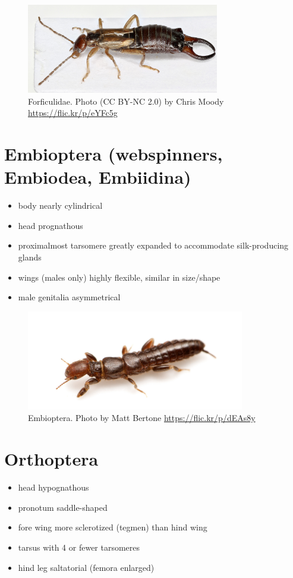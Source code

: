 \documentclass[letterpaper, 11pt]{article}
\begin{document}
\begin{figure}[ht!]
  \centering
    \includegraphics[width=0.75\textwidth]{forfic1}
  \caption{Forficulidae. Photo (CC BY-NC 2.0) by Chris Moody \url{https://flic.kr/p/eYFc5g}}
  \label{fig:forfic1}
\end{figure}

\section{Embioptera (webspinners, Embiodea, Embiidina)}
\begin{itemize}
\item body nearly cylindrical
\item head prognathous
\item proximalmost tarsomere greatly expanded to accommodate silk-producing glands
\item wings (males only) highly flexible, similar in size/shape
\item male genitalia asymmetrical
\end{itemize}

\begin{figure}[ht!]
  \centering
    \includegraphics[width=0.85\textwidth]{embiop}
  \caption{Embioptera. Photo \textcopyright{ } by Matt Bertone \url{https://flic.kr/p/dEAs8y}}
  \label{fig:embiop1}
\end{figure}

\section{Orthoptera}
\begin{itemize}
\item head hypognathous
\item pronotum saddle-shaped
\item fore wing more sclerotized (tegmen) than hind wing
\item tarsus with 4 or fewer tarsomeres
\item hind leg saltatorial (femora enlarged)
\end{itemize}
\end{document}
